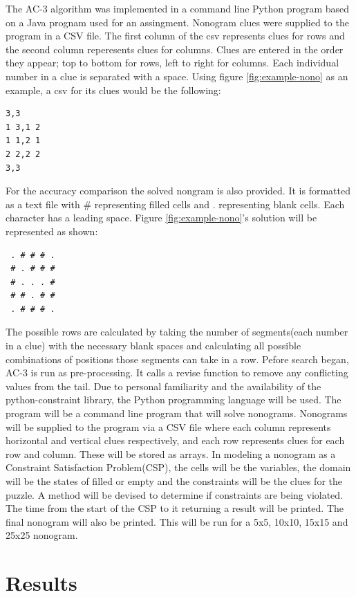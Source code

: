\documentclass[12pt, letterpaper]
{article}
\begin{document}
The AC-3 algorithm was implemented in a command line Python program based on a Java prognam used for an assingment. Nonogram clues were supplied to the program in a CSV file. The first column of the csv represents clues for rows and the second column reperesents clues for columns. Clues are entered in the order they appear; top to bottom for rows, left to right for columns. Each individual number in a clue is separated with a space. Using figure \ref{fig:example-nono} as an example, a csv for its clues would be the following:
\begin{lstlisting}
3,3
1 3,1 2
1 1,2 1
2 2,2 2
3,3
\end{lstlisting}
For the accuracy comparison the solved nongram is also provided. It is formatted as a text file with \# representing filled cells and . representing blank cells. Each character has a leading space. Figure \ref{fig:example-nono}'s solution will be represented as shown:
\begin{lstlisting}
 . # # # .
 # . # # #
 # . . . #
 # # . # #
 . # # # .
\end{lstlisting}

The possible rows are calculated by taking the number of segments(each number in a clue) with the necessary blank spaces and calculating all possible combinations of positions those segments can take in a row. Pefore search began, AC-3 is run as pre-processing. It calls a revise function to remove any conflicting values from the tail.
Due to personal familiarity and the availability of the python-constraint \cite{pycon} library, the Python programming language will be used. The program will be a command line program that will solve nonograms. Nonograms will be supplied to the program via a CSV file where each column represents horizontal and vertical clues respectively, and each row represents clues for each row and column. These will be stored as arrays.
In modeling a nonogram as a Constraint Satisfaction Problem(CSP), the cells will be the variables, the domain will be the states of filled or empty and the constraints will be the clues for the puzzle. A method will be devised to determine if constraints are being violated. The time from the start of the CSP to it returning a result will be printed. The final nonogram will also be printed. This will be run for a 5x5, 10x10, 15x15 and 25x25 nonogram.

\section{Results}
\end{document}
